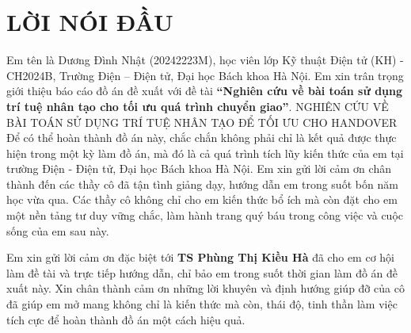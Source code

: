 \section*{LỜI NÓI ĐẦU}
\thispagestyle{empty}
Em tên là Dương Đình Nhật (20242223M), học viên lớp Kỹ thuật Điện tử (KH) - CH2024B, Trường Điện – Điện tử, Đại học Bách khoa Hà Nội. Em xin trân trọng giới thiệu báo cáo đồ án đề xuất với đề tài \textbf{ “Nghiên cứu về bài toán sử dụng trí tuệ nhân tạo cho tối ưu quá trình chuyển giao”}.
NGHIÊN CỨU VỀ BÀI TOÁN SỬ DỤNG TRÍ TUỆ NHÂN TẠO ĐỂ TỐI ƯU CHO HANDOVER
Để có thể hoàn thành đồ án này, chắc chắn không phải chỉ là kết quả được thực hiện trong một kỳ làm đồ án, mà đó là cả quá trình tích lũy kiến thức của em tại trường Điện - Điện tử, Đại học Bách khoa Hà Nội. Em xin gửi lời cảm ơn chân thành đến các thầy cô đã tận tình giảng dạy, hướng dẫn em trong suốt bốn năm học vừa qua. Các thầy cô không chỉ cho em kiến thức bổ ích mà còn đặt cho em một nền tảng tư duy vững chắc, làm hành trang quý báu trong công việc và cuộc sống của em sau này.

Em xin gửi lời cảm ơn đặc biệt tới \textbf{TS Phùng Thị Kiều Hà } đã cho em cơ hội làm đề tài và trực tiếp hướng dẫn, chỉ bảo em trong suốt thời gian làm đồ án đề xuất này. Xin chân thành cảm ơn những lời khuyên và định hướng giúp đỡ của cô đã giúp em mở mang không chỉ là kiến thức mà còn, thái độ, tinh thần làm việc tích cực để hoàn thành đồ án một cách hiệu quả.

\cleardoublepage